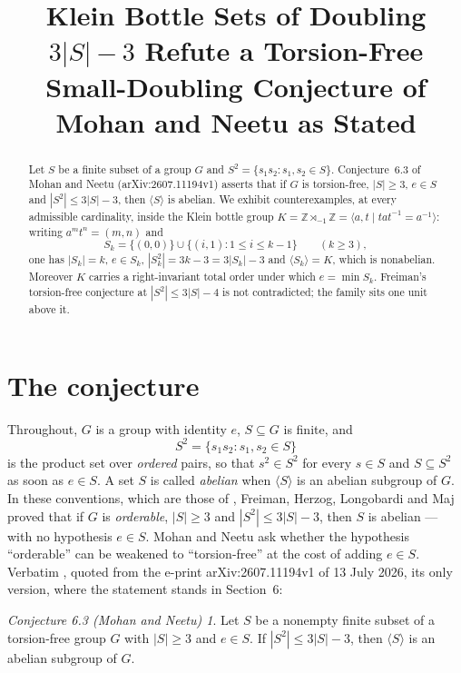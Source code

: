 \documentclass[11pt]{amsart}
\title[Klein bottle sets of doubling $3|S|-3$]
{Klein Bottle Sets of Doubling $3|S|-3$ Refute a Torsion-Free
 Small-Doubling Conjecture of Mohan and Neetu as Stated}
\date{}
\theoremstyle{remark}
\newtheorem*{conjectureA}{Conjecture 6.3 (Mohan and Neetu)}
\begin{document}
\begin{abstract}
Let $S$ be a finite subset of a group $G$ and $S^{2}=\{s_{1}s_{2}:s_{1},s_{2}\in S\}$.
Conjecture~6.3 of Mohan and Neetu (arXiv:2607.11194v1) asserts that if $G$ is
torsion-free, $|S|\ge3$, $e\in S$ and $|S^{2}|\le3|S|-3$, then $\langle S\rangle$
is abelian. We exhibit counterexamples, at every admissible cardinality, inside
the Klein bottle group
$K=\mathbb{Z}\rtimes_{-1}\mathbb{Z}=\langle a,t\mid tat^{-1}=a^{-1}\rangle$:
writing $a^{m}t^{n}=(m,n)$ and
\[
  S_{k}=\{(0,0)\}\cup\{(i,1):1\le i\le k-1\}\qquad(k\ge3),
\]
one has $|S_{k}|=k$, $e\in S_{k}$, $|S_{k}^{2}|=3k-3=3|S_{k}|-3$ and
$\langle S_{k}\rangle=K$, which is nonabelian. Moreover $K$ carries a
right-invariant total order under which $e=\min S_{k}$. Freiman's torsion-free
conjecture at $|S^{2}|\le3|S|-4$ is not contradicted; the family sits one unit
above it.
\end{abstract}

\maketitle

\section{The conjecture}

Throughout, $G$ is a group with identity $e$, $S\subseteq G$ is finite, and
\[
  S^{2}=\{s_{1}s_{2}:s_{1},s_{2}\in S\}
\]
is the product set over \emph{ordered} pairs, so that $s^{2}\in S^{2}$ for every
$s\in S$ and $S\subseteq S^{2}$ as soon as $e\in S$. A set $S$ is called
\emph{abelian} when $\langle S\rangle$ is an abelian subgroup of $G$. In these
conventions, which are those of \cite{MN}, Freiman, Herzog, Longobardi and Maj
proved \cite[Theorem~1.3]{FHLM} that if $G$ is \emph{orderable}, $|S|\ge3$ and
$|S^{2}|\le3|S|-3$, then $S$ is abelian --- with no hypothesis $e\in S$. Mohan and
Neetu ask whether the hypothesis ``orderable'' can be weakened to
``torsion-free'' at the cost of adding $e\in S$. Verbatim
\cite[Conjecture~6.3]{MN}, quoted from the e-print arXiv:2607.11194v1 of 13 July
2026, its only version, where the statement stands in Section~6:

\begin{conjectureA}
Let $S$ be a nonempty finite subset of a torsion-free group $G$ with
$\left|S\right| \geq 3$ and $e\in S$. If $\left|S^{2}\right| \leq 3|S|-3$, then
$\langle S\rangle$ is an abelian subgroup of $G$.
\end{conjectureA}
\end{document}
